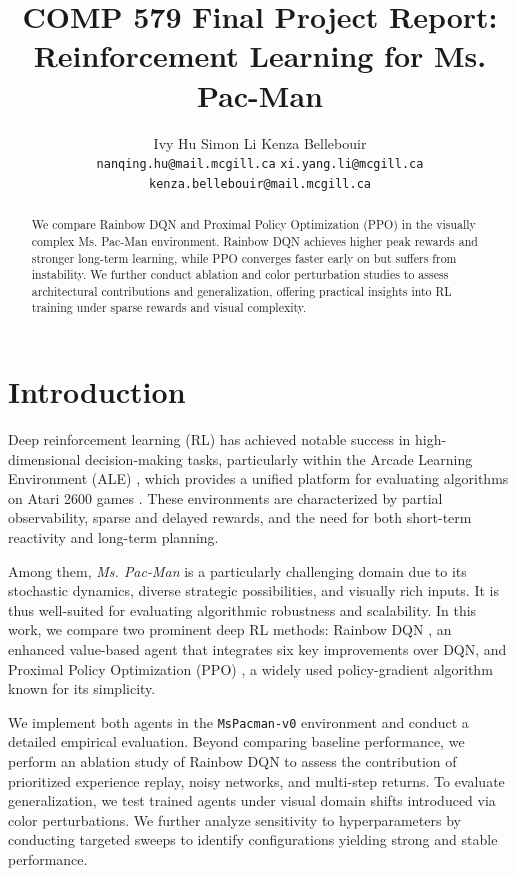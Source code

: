\documentclass{article}
\title{COMP 579 Final Project Report: Reinforcement Learning for Ms. Pac-Man}
\author{
    Ivy Hu\quad
    Simon Li\quad
    Kenza Bellebouir \\
    \texttt{nanqing.hu@mail.mcgill.ca} \quad
    \texttt{xi.yang.li@mcgill.ca} \quad
    \texttt{kenza.bellebouir@mail.mcgill.ca}
}
\begin{document}
\maketitle

\begin{abstract}
  We compare Rainbow DQN and Proximal Policy Optimization (PPO) in the visually complex Ms. Pac-Man environment. Rainbow DQN achieves higher peak rewards and stronger long-term learning, while PPO converges faster early on but suffers from instability. We further conduct ablation and color perturbation studies to assess architectural contributions and generalization, offering practical insights into RL training under sparse rewards and visual complexity.
\end{abstract}

\section{Introduction}

Deep reinforcement learning (RL) has achieved notable success in high-dimensional decision-making tasks, particularly within the Arcade Learning Environment (ALE) \cite{ale}, which provides a unified platform for evaluating algorithms on Atari 2600 games \cite{mnih2015human}. These environments are characterized by partial observability, sparse and delayed rewards, and the need for both short-term reactivity and long-term planning.

Among them, \textit{Ms. Pac-Man} is a particularly challenging domain due to its stochastic dynamics, diverse strategic possibilities, and visually rich inputs. It is thus well-suited for evaluating algorithmic robustness and scalability. In this work, we compare two prominent deep RL methods: Rainbow DQN \cite{hessel2018rainbow}, an enhanced value-based agent that integrates six key improvements over DQN, and Proximal Policy Optimization (PPO) \cite{schulman2017proximal}, a widely used policy-gradient algorithm known for its simplicity.

We implement both agents in the \texttt{MsPacman-v0} environment and conduct a detailed empirical evaluation. Beyond comparing baseline performance, we perform an ablation study of Rainbow DQN to assess the contribution of prioritized experience replay, noisy networks, and multi-step returns. To evaluate generalization, we test trained agents under visual domain shifts introduced via color perturbations. We further analyze sensitivity to hyperparameters by conducting targeted sweeps to identify configurations yielding strong and stable performance.
\end{document}
